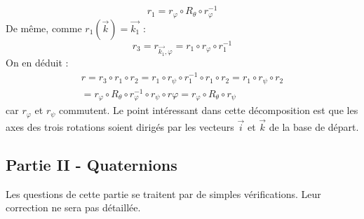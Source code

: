 \begin{enumerate}
\begin{displaymath}
 r_1 = r_\varphi \circ R_\theta \circ r_\varphi ^{-1}
\end{displaymath}
De même, comme $r_1(\overrightarrow{k})=\overrightarrow{k_1}$ :
\begin{displaymath}
 r_3 = r_{\overrightarrow{k_1},\varphi}=r_1\circ r_\varphi \circ r_1^{-1}
\end{displaymath}
On en déduit :
\begin{multline*}
 r = r_3\circ r_1 \circ r_2 = r_1 \circ r_\psi \circ r_1^{-1}\circ r_1 \circ r_2 
= r_1 \circ r_\psi \circ r_2 \\
= r_\varphi \circ R_\theta \circ r_\varphi^{-1}\circ r_\psi \circ r\varphi 
=  r_\varphi \circ R_\theta \circ r_\psi
\end{multline*}
car $r_\varphi$ et $r_\psi$ commutent. Le point intéressant dans cette décomposition est que les axes des trois rotations soient dirigés par les vecteurs $\overrightarrow{i}$ et $\overrightarrow{k}$ de la base de départ.
\end{enumerate}

\subsection*{Partie II - Quaternions}
Les questions de cette partie se traitent par de simples vérifications. Leur correction ne sera pas détaillée.

